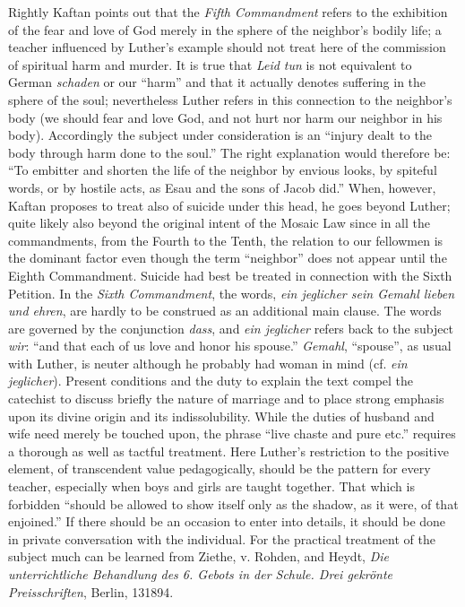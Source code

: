 Rightly Kaftan points out that the \emph{Fifth Commandment} refers to the exhibition of the fear and love of God merely in the sphere of the neighbor’s bodily life; a teacher influenced by Luther’s example should not treat here of the commission of spiritual harm and murder. It is true that \emph{Leid tun} is not equivalent to German \emph{schaden} or our “harm” and that it actually denotes suffering in the sphere of the soul; nevertheless Luther refers in this connection to the neighbor’s body (we should fear and love God, and not hurt nor harm our neighbor in his body). Accordingly the subject under consideration is an “injury dealt to the body through harm done to the soul.” The right explanation would therefore be: “To embitter and shorten the life of the neighbor by envious looks, by spiteful words, or by hostile acts, as Esau and the sons of Jacob did.” When, however, Kaftan proposes to treat also of suicide under this head, he goes beyond Luther; quite likely also beyond the original intent of the Mosaic Law since in all the commandments, from the Fourth to the Tenth, the relation to our fellowmen is the dominant factor even though the term “neighbor” does not appear until the Eighth Commandment. Suicide had best be treated in connection with the Sixth Petition.
In the \emph{Sixth Commandment}, the words, \emph{\emph{ein jeglicher} sein \emph{Gemahl} lieben und ehren}, are hardly to be construed as an additional main clause. The words are governed by the conjunction \emph{dass}, and \emph{ein jeglicher} refers back to the subject \emph{wir}: “and that each of us love and honor his spouse.” \emph{Gemahl}, “spouse”, as usual with Luther, is neuter although he probably had woman in mind (cf. \emph{ein jeglicher}). Present conditions and the duty to explain the text compel the catechist to discuss briefly the nature of marriage and to place strong emphasis upon its divine origin and its indissolubility. While the duties of husband and wife need merely be touched upon, the phrase “live chaste and pure etc.” requires a thorough as well as tactful treatment. Here Luther’s restriction to the positive element, of transcendent value pedagogically, should be the pattern for every teacher, especially when boys and girls are taught together. That which is forbidden “should be allowed to show itself only as the shadow, as it were, of that enjoined.” If there should be an occasion to enter into details, it should be done in private conversation with the individual. For the practical treatment of the subject much can be learned from Ziethe, v. Rohden, and Heydt, \emph{Die unterrichtliche Behandlung des 6. Gebots in der Schule. Drei gekrönte Preisschriften}, Berlin, 131894.

